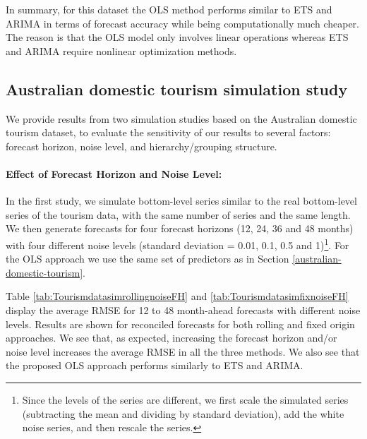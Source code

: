 \documentclass[11pt,a4paper,]{article}
\begin{document}
In summary, for this dataset the OLS method performs similar to ETS and ARIMA in terms of forecast accuracy while being computationally much cheaper. The reason is that the OLS model only involves linear operations whereas ETS and ARIMA require nonlinear optimization methods.

\hypertarget{australian-domestic-tourism-simulation-study}{%
\subsection{Australian domestic tourism simulation study}\label{australian-domestic-tourism-simulation-study}}

We provide results from two simulation studies based on the Australian domestic tourism dataset, to evaluate the sensitivity of our results to several factors: forecast horizon, noise level, and hierarchy/grouping structure.

\paragraph{Effect of Forecast Horizon and Noise Level:}

In the first study, we simulate bottom-level series similar to the real bottom-level series of the tourism data, with the same number of series and the same length. We then generate forecasts for four forecast horizons (12, 24, 36 and 48 months) with four different noise levels (standard deviation = 0.01, 0.1, 0.5 and 1)\footnote{Since the levels of the series are different, we first scale the simulated series (subtracting the mean and dividing by standard deviation), add the white noise series, and then rescale the series.}. For the OLS approach we use the same set of predictors as in Section \ref{australian-domestic-tourism}.

Table \ref{tab:TourismdatasimrollingnoiseFH} and \ref{tab:TourismdatasimfixnoiseFH} display the average RMSE for 12 to 48 month-ahead forecasts with different noise levels. Results are shown for reconciled forecasts for both rolling and fixed origin approaches. We see that, as expected, increasing the forecast horizon and/or noise level increases the average RMSE in all the three methods. We also see that the proposed OLS approach performs similarly to ETS and ARIMA.
\end{document}
